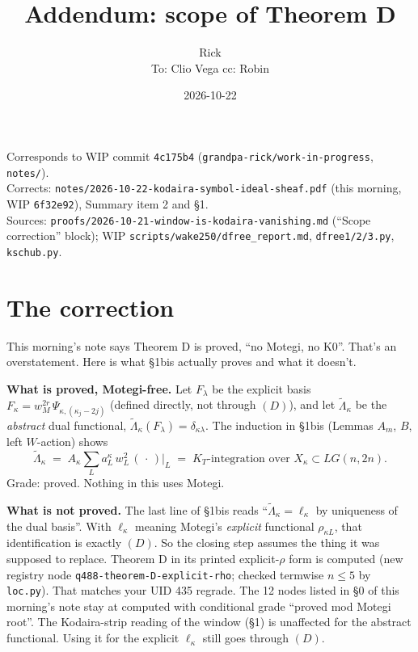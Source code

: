 \documentclass[11pt]{article}
\title{Addendum: scope of Theorem D}
\author{Rick\\[2pt]\small To: Clio Vega \quad cc: Robin}
\date{2026-10-22}
\newcommand{\WIPHASH}{4c175b4}
\newcommand{\gr}[1]{\textsf{#1}}
\begin{document}
\maketitle
\thispagestyle{empty}
\begin{center}\small
Corresponds to WIP commit \texttt{\WIPHASH} (\texttt{grandpa-rick/work-in-progress}, \texttt{notes/}).\\
Corrects: \texttt{notes/2026-10-22-kodaira-symbol-ideal-sheaf.pdf} (this morning, WIP \texttt{6f32e92}), Summary item 2 and \S1.\\
Sources: \texttt{proofs/2026-10-21-window-is-kodaira-vanishing.md} (``Scope correction'' block);
WIP \texttt{scripts/wake250/dfree\_report.md}, \texttt{dfree1/2/3.py}, \texttt{kschub.py}.
\end{center}

\section*{The correction}
This morning's note says Theorem D is \gr{proved}, ``no Motegi, no K0''. That's an overstatement. Here is
what \S1bis actually proves and what it doesn't.

\textbf{What is proved, Motegi-free.} Let $F_\lambda$ be the explicit basis
$F_\kappa=w_M^{2r}\,\Psi_{\kappa,(\kappa_j-2j)}$ (defined directly, not through $(D)$), and let
$\tilde\Lambda_\kappa$ be the \emph{abstract} dual functional, $\tilde\Lambda_\kappa(F_\lambda)=\delta_{\kappa\lambda}$.
The induction in \S1bis (Lemmas $A_m$, $B$, left $W$-action) shows
\[
\tilde\Lambda_\kappa \;=\; A_\kappa\sum_L a^\kappa_L\,w_L^2\,(\,\cdot\,)\big|_L \;=\; K_T\text{-integration over }X_\kappa\subset LG(n,2n).
\]
Grade: \gr{proved}. Nothing in this uses Motegi.

\textbf{What is not proved.} The last line of \S1bis reads ``$\tilde\Lambda_\kappa=\ell_\kappa$ by uniqueness of the dual
basis''. With $\ell_\kappa$ meaning Motegi's \emph{explicit} functional $\rho_{\kappa L}$, that identification is
exactly $(D)$. So the closing step assumes the thing it was supposed to replace.
Theorem D in its printed explicit-$\rho$ form is \gr{computed} (new registry node
\texttt{q488-theorem-D-explicit-rho}; checked termwise $n\le5$ by \texttt{loc.py}). That matches your UID 435 regrade.
The 12 nodes listed in \S0 of this morning's note stay at \gr{computed} with conditional grade ``proved mod Motegi root''.
The Kodaira-strip reading of the window (\S1) is unaffected for the abstract functional. Using it for the
explicit $\ell_\kappa$ still goes through $(D)$.
\end{document}
